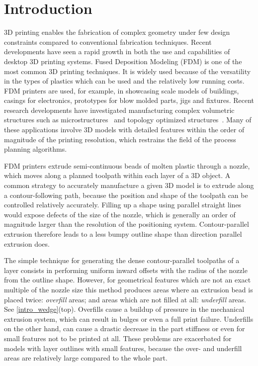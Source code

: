 \section{Introduction}
3D printing enables the fabrication of complex geometry under few design constraints compared to conventional fabrication techniques.
Recent developments have seen a rapid growth in both the use and capabilities of desktop 3D printing systems.
Fused Deposition Modeling (FDM) is one of the most common 3D printing techniques.
It is widely used because of the versatility in the types of plastics which can be used and the relatively low running costs.
FDM printers are used, for example, in showcasing scale models of buildings, casings for electronics, prototypes for blow molded parts, jigs and fixtures.
Recent research developments have investigated manufacturing complex volumetric structures such as microstructures~\cite{bates2018compressive,Al-Ketan2018,Maskery2018} and topology optimized structures~\cite{Zegard2016SMO,Wu2019a,Cheng2019}.
Many of these applications involve 3D models with detailed features within the order of magnitude of the printing resolution, which restrains the field of the process planning algorithms.

FDM printers extrude semi-continuous beads of molten plastic through a nozzle, which moves along a planned toolpath within each layer of a 3D object.
A common strategy to accurately manufacture a given 3D model is to extrude along a contour-following path,
because the position and shape of the toolpath can be controlled relatively accurately.
Filling up a shape using parallel straight lines would expose defects of the size of the nozzle, which is generally an order of magnitude larger than the resolution of the positioning system.
Contour-parallel extrusion therefore leads to a less bumpy outline shape than direction parallel extrusion does.


The simple technique for generating the dense contour-parallel toolpaths of a layer consists in performing uniform inward offsets with the radius of the nozzle from the outline shape.
However, for geometrical features which are not an exact multiple of the nozzle size this method produces areas where an extrusion bead is placed twice: \emph{overfill} areas; and areas which are not filled at all: \emph{underfill} areas.
See \cref{intro_wedge}(top).
Overfills cause a buildup of pressure in the mechanical extrusion system, which can result in bulges or even a full print failure.
Underfills on the other hand, can cause a drastic decrease in the part stiffness or even for small features not to be printed at all.
These problems are exacerbated for models with layer outlines with small features, because the over- and underfill areas are relatively large compared to the whole part.

